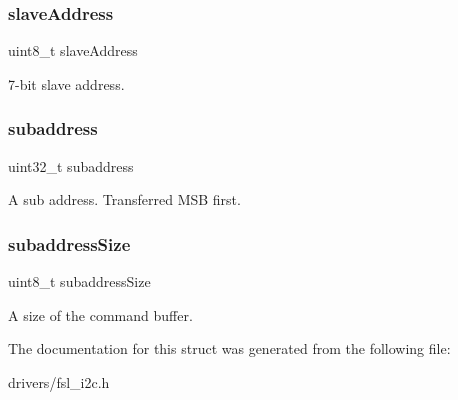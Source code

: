 \subsubsection{\texorpdfstring{slaveAddress}{slaveAddress}}
{\footnotesize\ttfamily uint8\+\_\+t slave\+Address}

7-\/bit slave address. \mbox{\label{struct__i2c__master__transfer_a6fbfb5e5018422a177a9f3ed7269b127}} 
\subsubsection{\texorpdfstring{subaddress}{subaddress}}
{\footnotesize\ttfamily uint32\+\_\+t subaddress}

A sub address. Transferred M\+SB first. \mbox{\label{struct__i2c__master__transfer_ab690ec66e8cde484f919799fb1118cd6}} 
\subsubsection{\texorpdfstring{subaddressSize}{subaddressSize}}
{\footnotesize\ttfamily uint8\+\_\+t subaddress\+Size}

A size of the command buffer. 

The documentation for this struct was generated from the following file\+:\begin{DoxyCompactItemize}
\item 
drivers/fsl\+\_\+i2c.\+h\end{DoxyCompactItemize}
